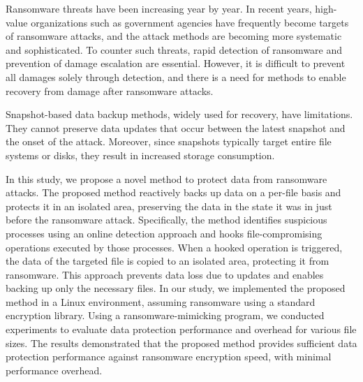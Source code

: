 Ransomware threats have been increasing year by year.
In recent years, high-value organizations such as government agencies have frequently become targets of ransomware attacks, and the attack methods are becoming more systematic and sophisticated.
To counter such threats, rapid detection of ransomware and prevention of damage escalation are essential.
However, it is difficult to prevent all damages solely through detection, and there is a need for methods to enable recovery from damage after ransomware attacks.

Snapshot-based data backup methods, widely used for recovery, have limitations.
They cannot preserve data updates that occur between the latest snapshot and the onset of the attack.
Moreover, since snapshots typically target entire file systems or disks, they result in increased storage consumption.

In this study, we propose a novel method to protect data from ransomware attacks.
The proposed method reactively backs up data on a per-file basis and protects it in an isolated area, preserving the data in the state it was in just before the ransomware attack.
Specifically, the method identifies suspicious processes using an online detection approach and hooks file-compromising operations executed by those processes.
When a hooked operation is triggered, the data of the targeted file is copied to an isolated area, protecting it from ransomware.
This approach prevents data loss due to updates and enables backing up only the necessary files.
% 
In our study, we implemented the proposed method in a Linux environment, assuming ransomware using a standard encryption library.
Using a ransomware-mimicking program, we conducted experiments to evaluate data protection performance and overhead for various file sizes.
The results demonstrated that the proposed method provides sufficient data protection performance against ransomware encryption speed, with minimal performance overhead.
